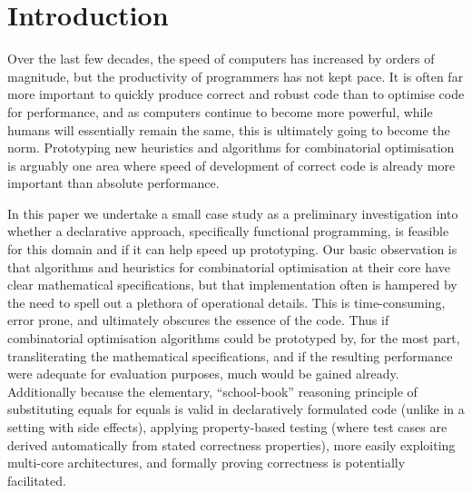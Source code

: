 \section{Introduction}

Over the last few decades, the speed of computers has increased by orders of
magnitude, but the productivity of programmers has not kept pace. It is often far more
important to quickly produce correct and robust code than to optimise code for
performance, and as computers continue to become more powerful, while humans
will essentially remain the same, this is ultimately going to become the norm.
Prototyping new heuristics and algorithms for combinatorial optimisation is
arguably one area where speed of development of correct code is already more
important than absolute performance.

In this paper we undertake a small case study as a preliminary investigation
into whether a declarative approach, specifically functional programming, is
feasible for this domain and if it can help speed up prototyping. Our
basic observation is that algorithms and heuristics for combinatorial
optimisation at their core have clear mathematical specifications, but that
implementation often is hampered by the need to spell out a plethora of
operational details. This is time-consuming, error prone, and ultimately
obscures the essence of the code. Thus if combinatorial optimisation
algorithms could be prototyped by, for the most part, transliterating the
mathematical specifications, and if the resulting performance were adequate
for evaluation purposes, much would be gained already.
Additionally because the elementary, ``school-book'' reasoning principle of
substituting equals for equals is valid in declaratively formulated code
(unlike in a setting with side effects), applying property-based testing
\cite{quickcheck} (where test cases are derived automatically from stated
correctness properties), more easily exploiting multi-core architectures, and formally proving correctness is potentially facilitated.


